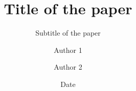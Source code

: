 \documentclass[twoside,article]{article}
\title{Title of the paper}
\subtitle{Subtitle of the paper} %
\author{Author 1 \and Author 2}
\date{Date}
\begin{document}
\maketitle{}

\cite{notsoshort}

\printbibliography
\end{document}
